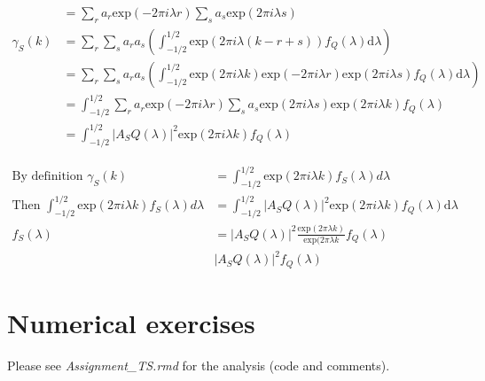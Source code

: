 \documentclass[10pt,a4paper]{article}
\begin{document}
\begin{enumerate}
\begin{enumerate}
\begin{align*}
			&= \sum_{r} a_r \text{exp}(-2\pi i \lambda r) \sum_{s} a_s \text{exp}(2\pi i \lambda s) \\			
			\gamma_{S}(k) &= \sum_{r} \sum_{s} a_r a_s \left(\int_{-1/2}^{1/2} \text{exp}(2\pi i \lambda (k-r+s)) f_Q(\lambda)\text{d}\lambda \right) \\			
			&= \sum_{r} \sum_{s} a_r a_s  \left(\int_{-1/2}^{1/2} \text{exp}(2\pi i \lambda k) \text{exp}(-2\pi i \lambda r) \text{exp}(2\pi i \lambda s) f_Q(\lambda) \text{d}\lambda \right) \\			
			&= \int_{-1/2}^{1/2} \sum_{r} a_r \text{exp}(-2\pi i \lambda r) \sum_{s} a_s \text{exp}(2\pi i \lambda s) \text{exp}(2\pi i \lambda k) f_Q(\lambda) \\			
			&= \int_{-1/2}^{1/2} |A_SQ(\lambda)|^2 \text{exp}(2\pi i \lambda k) f_Q(\lambda)
		\end{align*}
	
		\begin{align*}			
			\text{By definition   } \gamma_{S}(k) &= \int_{-1/2}^{1/2} \text{exp}(2\pi i \lambda k) f_S(\lambda) d\lambda \\
			\text{Then   } \int_{-1/2}^{1/2} \text{exp}(2\pi i \lambda k) f_S(\lambda) d\lambda &= \int_{-1/2}^{1/2} |A_SQ(\lambda)|^2 \text{exp}(2\pi i \lambda k) f_Q(\lambda) \text{d}\lambda\\
			f_S(\lambda) &= |A_SQ(\lambda)|^2 \frac{\text{exp}(2\pi \lambda k)}{\text{exp}(2\pi \lambda k} f_Q(\lambda) \\
			&|A_SQ(\lambda)|^2 f_Q(\lambda)
		\end{align*}
	\end{enumerate}
\end{enumerate}
	\section{Numerical exercises}
	Please see \textit{Assignment\_TS.rmd} for the analysis (code and comments).
\end{document}
